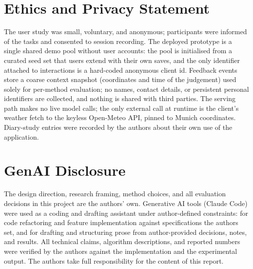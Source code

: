 \documentclass[acmlarge]{acmart}
\begin{document}
\section*{Ethics and Privacy Statement}
The user study was small, voluntary, and anonymous; participants were
informed of the tasks and consented to session recording. The deployed
prototype is a single shared demo pool without user accounts: the pool is
initialised from a curated seed set that users extend with their own
saves, and the only identifier attached to interactions is a hard-coded
anonymous client id. Feedback events store a coarse context snapshot
(coordinates and time of the judgement) used solely for per-method
evaluation; no names, contact details, or persistent personal identifiers
are collected, and nothing is shared with third parties. The serving path
makes no live model calls; the only external call at runtime is the
client's weather fetch to the keyless Open-Meteo API, pinned to Munich
coordinates. Diary-study entries were recorded by the authors about their
own use of the application.

\section*{GenAI Disclosure}
The design direction, research framing, method choices, and all evaluation
decisions in this project are the authors' own. Generative AI tools
(Claude Code) were used as a coding and drafting assistant under
author-defined constraints: for code refactoring and feature implementation
against specifications the authors set, and for drafting and structuring
prose from author-provided decisions, notes, and results. All technical
claims, algorithm descriptions, and reported numbers were verified by the
authors against the implementation and the experimental output. The authors
take full responsibility for the content of this report.

{}


\end{document}
